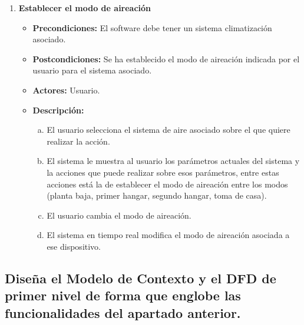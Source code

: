 \begin{enumerate}
    
    \item \textbf{Establecer el modo de aireación}
    \begin{itemize}
        \item \textbf{Precondiciones:} El software debe tener un sistema climatización asociado.
    \item \textbf{Postcondiciones:} Se ha establecido el modo de aireación indicada por el usuario para el sistema asociado.
    \item \textbf{Actores:} Usuario.
    \item \textbf{Descripción:}
    \begin{enumerate}[a.]
        \item El usuario selecciona el sistema de aire asociado sobre el que quiere realizar la acción.
        \item El sistema le muestra al usuario los parámetros actuales del sistema y la acciones que puede realizar sobre esos parámetros, entre estas acciones está la de establecer el modo de aireación entre los modos (planta baja, primer hangar, segundo hangar, toma de casa).
        \item El usuario cambia el modo de aireación.
        \item El sistema en tiempo real modifica el modo de aireación asociada a ese dispositivo.
    \end{enumerate}
    \end{itemize}

    
\end{enumerate}

\subsection{Diseña el Modelo de Contexto y el DFD de primer nivel de forma que englobe las funcionalidades del apartado anterior.}

